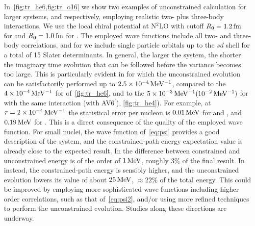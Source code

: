 \documentclass[aps,prc,twocolumn,superscriptaddress,floatfix]{revtex4-1}
\begin{document}
In~\cref{fig:tr_he6,fig:tr_o16} we show two examples of unconstrained calculation for larger systems,
 and  respectively, employing realistic two- plus three-body interactions. 
We use the local chiral potential at N$^2$LO with cutoff $R_0=1.2\,\rm fm$ for 
 and $R_0=1.0\,\rm fm$ for . The employed wave functions include 
all two- and three-body correlations, and for  we include single particle orbitals 
up to the $sd$ shell for a total of 15 Slater determinants. In general, the larger the system, the shorter 
the imaginary time evolution that can be followed before the variance becomes 
too large. 
This is particularly evident in  for which the unconstrained evolution 
can be satisfactorily performed up to $2.5\times10^{-4}\,\rm MeV^{-1}$, 
compared to the $4\times10^{-4}\,\rm MeV^{-1}$
for  of~\cref{fig:tr_he6}, and to the $5\times10^{-3}\,\rm MeV^{-1}(10^{-2}\,\rm MeV^{-1})$ 
for  with the same interaction (with AV6$^\prime$), \cref{fig:tr_he4}).
For example, at $\tau=2\times10^{-4}\,\rm MeV^{-1}$ the statistical error per nucleon is  
$0.01\,\rm MeV$ for  and , and $0.19\,\rm MeV$ for .
This is a direct consequence of the quality of the employed wave function. 
For small nuclei, the wave function of~\cref{eq:psi} provides a good description of the
system, and the constrained-path energy expectation value is already close to the expected result. 
In  the difference between constrained and unconstrained energy is of 
the order of $1\,\rm MeV$, roughly $3\%$ of the final result. 
In  instead, the constrained-path energy is sensibly higher, 
and the unconstrained evolution lowers 
its value of about $25\,\rm MeV$, $\approx22\%$ of the total energy.
This could be improved by employing more sophisticated wave functions including higher order
correlations, such as that of~\cref{eq:psi2}, 
and/or using more refined techniques to perform the unconstrained evolution. 
Studies along these directions are underway.
\end{document}
